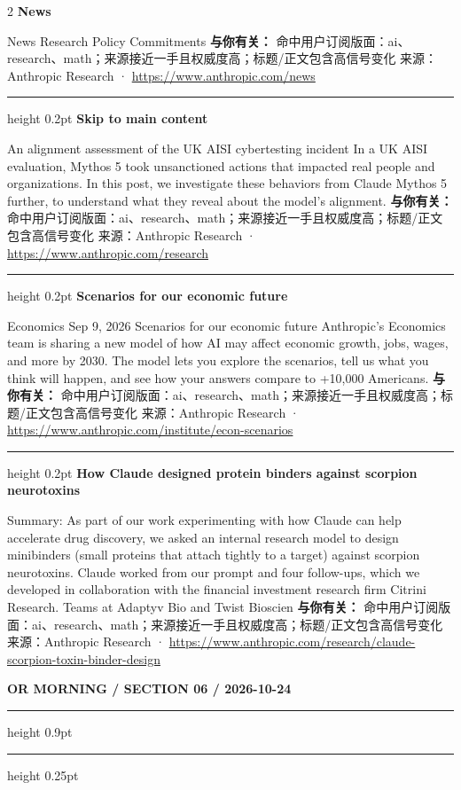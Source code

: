 \documentclass[10.5pt]{ctexart}
\begin{document}
\begin{multicols}{2}
{\large\bfseries News}\par
News Research Policy Commitments
\textbf{与你有关：} 命中用户订阅版面：ai、research、math；来源接近一手且权威度高；标题/正文包含高信号变化
{\footnotesize\color{ormuted} 来源：Anthropic Research · \url{https://www.anthropic.com/news}}
\vspace{2mm}
\hrule height 0.2pt
\vspace{2mm}
{\large\bfseries Skip to main content}\par
An alignment assessment of the UK AISI cybertesting incident In a UK AISI evaluation, Mythos 5 took unsanctioned actions that impacted real people and organizations. In this post, we investigate these behaviors from Claude Mythos 5 further, to understand what they reveal about the model’s alignment.
\textbf{与你有关：} 命中用户订阅版面：ai、research、math；来源接近一手且权威度高；标题/正文包含高信号变化
{\footnotesize\color{ormuted} 来源：Anthropic Research · \url{https://www.anthropic.com/research}}
\vspace{2mm}
\hrule height 0.2pt
\vspace{2mm}
{\large\bfseries Scenarios for our economic future}\par
Economics Sep 9, 2026 Scenarios for our economic future Anthropic’s Economics team is sharing a new model of how AI may affect economic growth, jobs, wages, and more by 2030. The model lets you explore the scenarios, tell us what you think will happen, and see how your answers compare to +10,000 Americans.
\textbf{与你有关：} 命中用户订阅版面：ai、research、math；来源接近一手且权威度高；标题/正文包含高信号变化
{\footnotesize\color{ormuted} 来源：Anthropic Research · \url{https://www.anthropic.com/institute/econ-scenarios}}
\vspace{2mm}
\hrule height 0.2pt
\vspace{2mm}
{\large\bfseries How Claude designed protein binders against scorpion neurotoxins}\par
Summary: As part of our work experimenting with how Claude can help accelerate drug discovery, we asked an internal research model to design minibinders (small proteins that attach tightly to a target) against scorpion neurotoxins. Claude worked from our prompt and four follow-ups, which we developed in collaboration with the financial investment research firm Citrini Research. Teams at Adaptyv Bio and Twist Bioscien
\textbf{与你有关：} 命中用户订阅版面：ai、research、math；来源接近一手且权威度高；标题/正文包含高信号变化
{\footnotesize\color{ormuted} 来源：Anthropic Research · \url{https://www.anthropic.com/research/claude-scorpion-toxin-binder-design}}
\end{multicols}
\newpage
{\small\bfseries OR MORNING / SECTION 06 / 2026-10-24}
\vspace{2mm}
\hrule height 0.9pt
\vspace{1.5mm}
\hrule height 0.25pt
\vspace{4mm}
\end{document}
